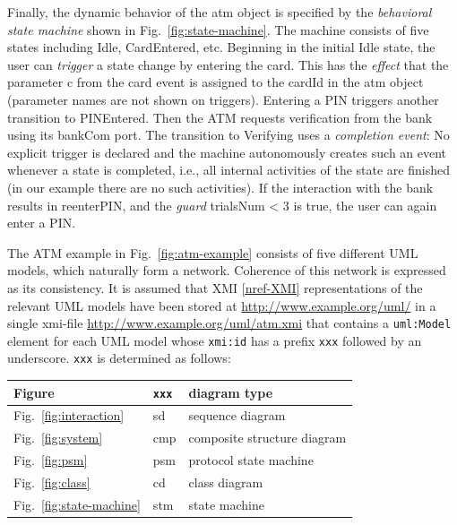 \documentclass[10pt, a4paper]{isov2}
\renewcommand{\noterefname}{note}
\renewcommand{\nref}[1]{\noterefname~\ref{#1}}
\renewcommand{\nref}[1]{\ref{nref-#1}}
\newcommand{\uml}[1]{\textsf{#1}}
\begin{document}
Finally, the dynamic behavior of the \uml{atm} object is specified by
the \emph{behavioral state machine} shown in
Fig.~\ref{fig:state-machine}. The machine consists of five states
including \uml{Idle}, \uml{CardEntered}, etc.  Beginning in the
initial \uml{Idle} state, the user can \emph{trigger} a state change
by entering the \uml{card}. This has the \emph{effect} that the
parameter \uml{c} from the \uml{card} event is assigned to the
\uml{cardId} in the \uml{atm} object (parameter names are not shown on
triggers). Entering a \uml{PIN} triggers another transition to
\uml{PINEntered}.  Then the ATM requests verification from the bank
using its \uml{bankCom} port.  The transition to \uml{Verifying} uses
a \emph{completion event}: No explicit trigger is declared and the
machine autonomously creates such an event whenever a state is
completed, i.e., all internal activities of the state are finished (in
our example there are no such activities).  If the interaction with
the bank results in \uml{reenterPIN}, and the \emph{guard}
\uml{trialsNum < 3} is true, the user can again enter a \uml{PIN}.


The ATM example in Fig.~\ref{fig:atm-example} consists of five different
UML models, which naturally form a network. Coherence of this network is
expressed as its consistency.  It is assumed that XMI \nref{XMI} representations of
the relevant UML models have been stored at
\url{http://www.example.org/uml/} in a single xmi-file \url{http://www.example.org/uml/atm.xmi} that contains a
\texttt{uml:Model} element for each UML model whose \texttt{xmi:id} has
a prefix \texttt{xxx} followed by an underscore. \texttt{xxx} is determined 
as follows:\medskip

\begin{tabular}{|l|l|l|}\hline
\textbf{Figure} & \textbf{\texttt{xxx}} & \textbf{diagram type}\\\hline
Fig.~\ref{fig:interaction} & sd & sequence diagram\\\hline
Fig.~\ref{fig:system} & cmp & composite structure diagram\\\hline
Fig.~\ref{fig:psm} & psm & protocol state machine\\\hline
Fig.~\ref{fig:class} & cd & class diagram\\\hline
Fig.~\ref{fig:state-machine} & stm & state machine\\\hline
\end{tabular}
\end{document}

